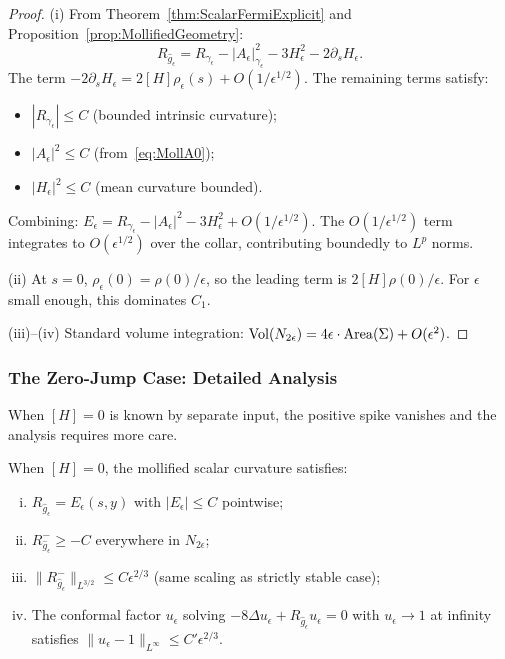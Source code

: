 \begin{proof}
(i) From Theorem~\ref{thm:ScalarFermiExplicit} and Proposition~\ref{prop:MollifiedGeometry}:
\[
R_{\hat{g}_\epsilon} = R_{\gamma_\epsilon} - |A_\epsilon|^2_{\gamma_\epsilon} - 3H_\epsilon^2 - 2\partial_s H_\epsilon.
\]
The term $-2\partial_s H_\epsilon = 2[H] \rho_\epsilon(s) + O(1/\epsilon^{1/2})$. The remaining terms satisfy:
\begin{itemize}
\item $|R_{\gamma_\epsilon}| \le C$ (bounded intrinsic curvature);
\item $|A_\epsilon|^2 \le C$ (from~\eqref{eq:MollA0});
\item $|H_\epsilon|^2 \le C$ (mean curvature bounded).
\end{itemize}
Combining: $E_\epsilon = R_{\gamma_\epsilon} - |A_\epsilon|^2 - 3H_\epsilon^2 + O(1/\epsilon^{1/2})$. The $O(1/\epsilon^{1/2})$ term integrates to $O(\epsilon^{1/2})$ over the collar, contributing boundedly to $L^p$ norms.

(ii) At $s = 0$, $\rho_\epsilon(0) = \rho(0)/\epsilon$, so the leading term is $2[H] \rho(0)/\epsilon$. For $\epsilon$ small enough, this dominates $C_1$.

(iii)--(iv) Standard volume integration: $\operatorname{Vol}(N_{2\epsilon}) = 4\epsilon \cdot \operatorname{Area}(\Sigma) + O(\epsilon^2)$.
\end{proof}

\subsubsection{The Zero-Jump Case: Detailed Analysis}

When $[H] = 0$ is known by separate input, the positive spike vanishes and the analysis requires more care.

\begin{theorem}
\label{thm:MarginalSmoothing}
When $[H] = 0$, the mollified scalar curvature satisfies:
\begin{enumerate}[(i)]
\item $R_{\hat{g}_\epsilon} = E_\epsilon(s, y)$ with $|E_\epsilon| \le C$ pointwise;
\item $R^-_{\hat{g}_\epsilon} \ge -C$ everywhere in $N_{2\epsilon}$;
\item $\|R^-_{\hat{g}_\epsilon}\|_{L^{3/2}} \le C \epsilon^{2/3}$ (same scaling as strictly stable case);
\item The conformal factor $u_\epsilon$ solving $-8\Delta u_\epsilon + R_{\hat{g}_\epsilon} u_\epsilon = 0$ with $u_\epsilon \to 1$ at infinity satisfies $\|u_\epsilon - 1\|_{L^\infty} \le C' \epsilon^{2/3}$.
\end{enumerate}
\end{theorem}

